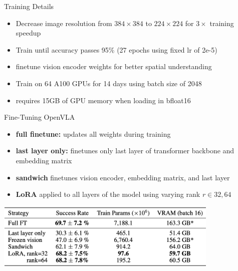 \documentclass{beamer}
\begin{document}
\begin{frame}[t]{Training Details}
    \begin{itemize}[label=-]
        \item Decrease image resolution from $384 \times 384$ to $224 \times 224$ for $3\times$ training speedup
        \item Train until accuracy passes 95\% (27 epochs using fixed lr of 2e-5)
        \item finetune vision encoder weights for better spatial understanding
        \item Train on 64 A100 GPUs for 14 days using batch size of 2048
        \item requires 15GB of GPU memory when loading in bfloat16
    \end{itemize}
\end{frame}
\begin{frame}[t]{Fine-Tuning OpenVLA}
    \begin{itemize}[label=-]
        \item \textbf{full finetune:} updates all weights during training
        \item \textbf{last layer only:} finetunes only last layer of transformer backbone and embedding matrix
        \item \textbf{sandwich} finetunes vision encoder, embedding matrix, and last layer 
        \item \textbf{LoRA} applied to all layers of the model using varying rank $r \in {32, 64}$
    \end{itemize}
    \begin{center}
        \includegraphics[width=0.8\textwidth]{./img/openvla_sft.png}
    \end{center}
\end{frame}
\end{document}
